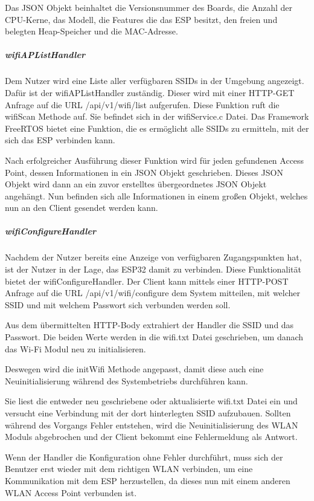 Das JSON Objekt beinhaltet die Versionsnummer des Boards, die Anzahl der CPU-Kerne, das Modell, die Features die das ESP besitzt, den freien und belegten Heap-Speicher und die MAC-Adresse.

\subparagraph{wifiAPListHandler} Dem Nutzer wird eine Liste aller verfügbaren SSIDs in der Umgebung angezeigt. Dafür ist der \glqq wifiAPListHandler\grqq{} zuständig. Dieser wird mit einer HTTP-GET Anfrage auf die URL \glqq /api/v1/wifi/list\grqq{} aufgerufen.
Diese Funktion ruft die \glqq wifiScan\grqq{} Methode auf. Sie befindet sich in der \glqq wifiService.c\grqq{} Datei. Das Framework FreeRTOS bietet eine Funktion, die es ermöglicht alle SSIDs zu ermitteln, mit der sich das ESP verbinden kann.

Nach erfolgreicher Ausführung dieser Funktion wird für jeden gefundenen Access Point, dessen Informationen in ein JSON Objekt geschrieben. Dieses JSON Objekt wird dann an ein zuvor erstelltes übergeordnetes JSON Objekt angehängt.
Nun befinden sich alle Informationen in einem großen Objekt, welches nun an den Client gesendet werden kann.

\subparagraph{wifiConfigureHandler} Nachdem der Nutzer bereits eine Anzeige von verfügbaren Zugangspunkten hat, ist der Nutzer in der Lage, das ESP32 damit zu verbinden.
Diese Funktionalität bietet der \glqq wifiConfigureHandler\grqq{}. Der Client kann mittels einer HTTP-POST Anfrage auf die URL \glqq /api/v1/wifi/configure\grqq{} dem System mitteilen, mit welcher SSID und mit welchem Passwort sich verbunden werden soll.

Aus dem übermittelten HTTP-Body extrahiert der Handler die SSID und das Passwort.
Die beiden Werte werden in die \glqq wifi.txt\grqq{} Datei geschrieben, um danach das Wi-Fi Modul neu zu initialisieren.

Deswegen wird die \glqq initWifi\grqq{} Methode angepasst, damit diese auch eine Neuinitialisierung während des Systembetriebs durchführen kann.

Sie liest die entweder neu geschriebene oder aktualisierte \glqq wifi.txt\grqq{} Datei ein und versucht eine Verbindung mit der dort hinterlegten SSID aufzubauen.
Sollten während des Vorgangs Fehler entstehen, wird die Neuinitialisierung des WLAN Moduls abgebrochen und der Client bekommt eine Fehlermeldung als Antwort.

Wenn der Handler die Konfiguration ohne Fehler durchführt, muss sich der Benutzer erst wieder mit dem richtigen WLAN verbinden, um eine Kommunikation mit dem ESP herzustellen, da dieses nun mit einem anderen WLAN Access Point verbunden ist.

